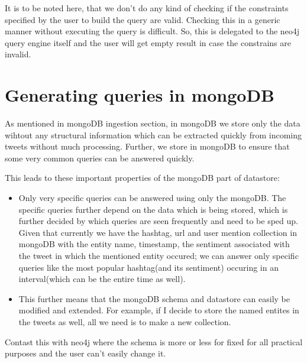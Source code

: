 \documentclass[letterpaper,10pt,english]{sphinxmanual}
\begin{document}
It is to be noted here, that we don’t do any kind of checking if the constraints specified by the user to build the query are valid. Checking this in a generic manner without executing the query is difficult. So, this is delegated to the neo4j query engine itself and the user will get empty result in case the constrains are invalid.


\chapter{Generating queries in mongoDB}
\label{\detokenize{mongoDB_query_generation:generating-queries-in-mongodb}}\label{\detokenize{mongoDB_query_generation::doc}}
As mentioned in mongoDB ingestion section, in mongoDB we store only the data wihtout any structural information which can be extracted quickly from incoming tweets without much processing. Further, we store in mongoDB to ensure that some very common queries can be answered quickly.

This leads to these important properties of the mongoDB part of datastore:
\begin{itemize}
\item {} 
Only very specific queries can be answered using only the mongoDB. The specific queries further depend on the data which is being stored, which is further decided by which queries are seen frequently and need to be sped up. Given that currently we have the hashtag, url and user mention collection in mongoDB with the entity name, timestamp, the sentiment associated with the tweet in which the mentioned entity occured; we can answer only specific queries like the most popular hashtag(and its sentiment) occuring in an interval(which can be the entire time as well).

\item {} 
This further means that the mongoDB schema and datastore can easily be modified and extended. For example, if I decide to store the named entites in the tweets as well, all we need is to make a new collection.

\end{itemize}

Contast this with neo4j where the schema is more or less for fixed for all practical purposes and the user can’t easily change it.
\end{document}
